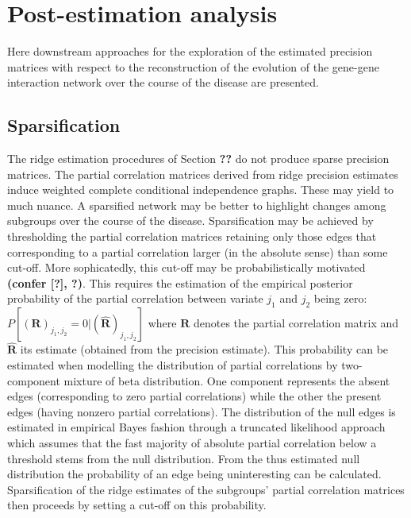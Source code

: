 \documentclass[10pt]{article}
\begin{document}
\section{Post-estimation analysis}\label{topology}
Here downstream approaches for the exploration of the estimated precision matrices with respect
to the reconstruction of the evolution of the gene-gene interaction network over the course of the
disease are presented.

\subsection{Sparsification}\label{sparsify}
The ridge estimation procedures of Section \textbf{??} do not produce sparse precision matrices. The partial correlation matrices derived from ridge precision estimates induce weighted complete conditional independence graphs. These may yield to much nuance. A sparsified network may be better to highlight changes among subgroups over the course of the disease. Sparsification may be achieved by thresholding the partial correlation matrices retaining only those edges that corresponding to a partial correlation larger (in the absolute sense) than some cut-off. More sophicatedly, this cut-off may be probabilistically motivated \textbf{(confer [?], ?)}. This requires the estimation of the empirical posterior probability of the partial correlation between variate $j_1$ and $j_2$ being zero: $P[(\mathbf{R})_{j_1,j_2} = 0| (\widehat{\mathbf{R}})_{j_1,j_2} ]$ where $\mathbf{R}$ denotes the partial correlation matrix and $\widehat{\mathbf{R}}$ its estimate (obtained from the precision estimate). This probability can be estimated when modelling the distribution of partial correlations by two-component mixture of beta distribution. One component represents the absent edges (corresponding to zero partial correlations) while the other the present edges (having nonzero partial correlations). The distribution of the null edges is estimated in empirical Bayes fashion through a truncated likelihood approach which assumes that the fast majority of absolute partial correlation below a threshold stems from the null distribution. From the thus estimated null distribution the
probability of an edge being uninteresting can be calculated. Sparsification of the ridge estimates of the subgroups' partial correlation matrices then proceeds by setting a cut-off on this probability.
\end{document}
